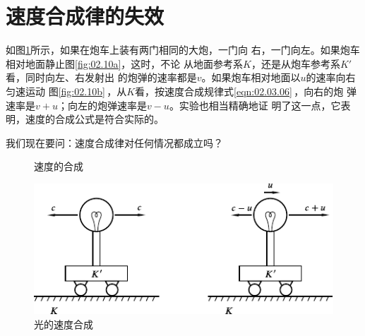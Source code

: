 \section{速度合成律的失效}\label{sec:02.06}

如图\ref{fig:02.10}所示，如果在炮车上装有两门相同的大炮，一门向
右，一门向左。如果炮车相对地面静止\lbr 图\ref{fig:02.10a}\rbr，这时，不论
从地面参考系$K$，还是从炮车参考系$K'$看，同时向左、右发射出
的炮弹的速率都是$v$。如果炮车相对地面以$u$的速率向右匀速运动
\lbr 图\ref{fig:02.10b}\,\rbr ，从$K$看，按速度合成规律\lbr 式\eqref{eqn:02.03.06}\,\rbr ，向右的炮
弹速率是$v+u$；向左的炮弹速率是$v-u$。实验也相当精确地证
明了这一点，它表明，速度的合成公式是符合实际的。

我们现在要问：速度合成律对任何情况都成立吗？

\clearpage
\begin{figure}
  \centering
  \hspace{2em}
  \caption{速度的合成}
  \label{fig:02.10}
\end{figure}

\begin{figure}
  \centering
  \includegraphics{figure/fig02.11}
  \caption{光的速度合成}
  \label{fig:02.11}
\end{figure}

